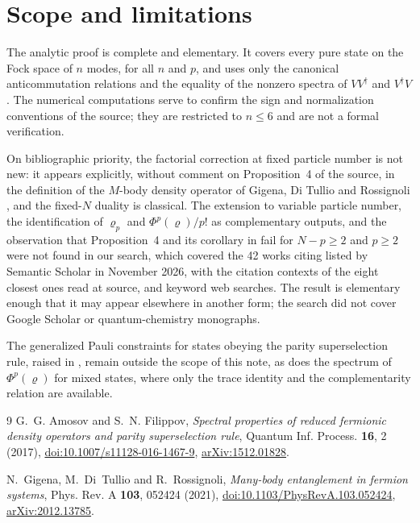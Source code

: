 \documentclass[11pt,a4paper]{article}
\theoremstyle{definition}
\theoremstyle{plain}
\begin{document}
\section{Scope and limitations}\label{sec:scope}
The analytic proof is complete and elementary. It covers every pure state on
the Fock space of $n$ modes, for all $n$ and $p$, and uses only the canonical
anticommutation relations and the equality of the nonzero spectra of
$VV^\dagger$ and $V^\dagger V$. The numerical computations serve to confirm
the sign and normalization conventions of the source; they are restricted to
$n\le6$ and are not a formal verification.

On bibliographic priority, the factorial correction at fixed particle number
is not new: it appears explicitly, without comment on Proposition~4 of the
source, in the definition of the $M$-body density operator of Gigena, Di
Tullio and Rossignoli \cite[Eq.~(79)]{Gigena2021}, and the fixed-$N$ duality
is classical. The extension to variable particle number, the
identification of $\varrho_p$ and $\Phi^p(\varrho)/p!$ as complementary
outputs, and the observation that Proposition~4 and its corollary in
\cite{AmosovFilippov2017} fail for $N-p\ge2$ and $p\ge2$ were not found in
our search, which covered the 42 works citing \cite{AmosovFilippov2017}
listed by Semantic Scholar in November 2026, with the citation contexts of
the eight closest ones read at source, and keyword web searches. The result
is elementary enough that it may appear elsewhere in another form; the search
did not cover Google Scholar or quantum-chemistry monographs.

The generalized Pauli constraints for states obeying the parity
superselection rule, raised in \cite{AmosovFilippov2017}, remain outside the
scope of this note, as does the spectrum of $\Phi^p(\varrho)$ for mixed
states, where only the trace identity and the complementarity relation are
available.

\begin{thebibliography}{9}
G.~G. Amosov and S.~N. Filippov,
\emph{Spectral properties of reduced fermionic density operators and parity
superselection rule},
Quantum Inf. Process. \textbf{16}, 2 (2017),
\href{https://doi.org/10.1007/s11128-016-1467-9}{doi:10.1007/s11128-016-1467-9},
\href{https://arxiv.org/abs/1512.01828}{arXiv:1512.01828}.

N.~Gigena, M.~Di~Tullio and R.~Rossignoli,
\emph{Many-body entanglement in fermion systems},
Phys. Rev. A \textbf{103}, 052424 (2021),
\href{https://doi.org/10.1103/PhysRevA.103.052424}{doi:10.1103/PhysRevA.103.052424},
\href{https://arxiv.org/abs/2012.13785}{arXiv:2012.13785}.
\end{thebibliography}
\end{document}
